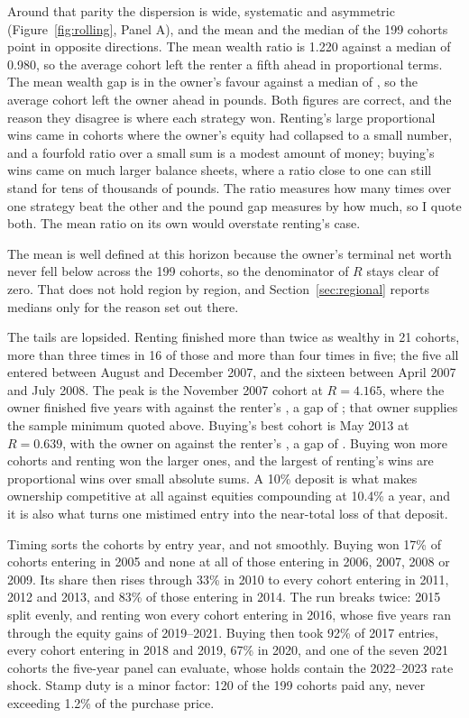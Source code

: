 Around that parity the dispersion is wide, systematic and asymmetric (Figure~\ref{fig:rolling}, Panel A), and the mean and the median of the 199 cohorts point in opposite directions. The mean wealth ratio is 1.220 against a median of 0.980, so the average cohort left the renter a fifth ahead in proportional terms. The mean wealth gap is  in the owner's favour against a median of , so the average cohort left the owner ahead in pounds. Both figures are correct, and the reason they disagree is where each strategy won. Renting's large proportional wins came in cohorts where the owner's equity had collapsed to a small number, and a fourfold ratio over a small sum is a modest amount of money; buying's wins came on much larger balance sheets, where a ratio close to one can still stand for tens of thousands of pounds. The ratio measures how many times over one strategy beat the other and the pound gap measures by how much, so I quote both. The mean ratio on its own would overstate renting's case.

The mean is well defined at this horizon because the owner's terminal net worth never fell below  across the 199 cohorts, so the denominator of $R$ stays clear of zero. That does not hold region by region, and Section~\ref{sec:regional} reports medians only for the reason set out there.

The tails are lopsided. Renting finished more than twice as wealthy in 21 cohorts, more than three times in 16 of those and more than four times in five; the five all entered between August and December 2007, and the sixteen between April 2007 and July 2008. The peak is the November 2007 cohort at $R = 4.165$, where the owner finished five years with  against the renter's , a gap of ; that owner supplies the sample minimum quoted above. Buying's best cohort is May 2013 at $R = 0.639$, with the owner on  against the renter's , a gap of . Buying won more cohorts and renting won the larger ones, and the largest of renting's wins are proportional wins over small absolute sums. A 10\% deposit is what makes ownership competitive at all against equities compounding at 10.4\% a year, and it is also what turns one mistimed entry into the near-total loss of that deposit.

Timing sorts the cohorts by entry year, and not smoothly. Buying won 17\% of cohorts entering in 2005 and none at all of those entering in 2006, 2007, 2008 or 2009. Its share then rises through 33\% in 2010 to every cohort entering in 2011, 2012 and 2013, and 83\% of those entering in 2014. The run breaks twice: 2015 split evenly, and renting won every cohort entering in 2016, whose five years ran through the equity gains of 2019--2021. Buying then took 92\% of 2017 entries, every cohort entering in 2018 and 2019, 67\% in 2020, and one of the seven 2021 cohorts the five-year panel can evaluate, whose holds contain the 2022--2023 rate shock. Stamp duty is a minor factor: 120 of the 199 cohorts paid any, never exceeding 1.2\% of the purchase price.

